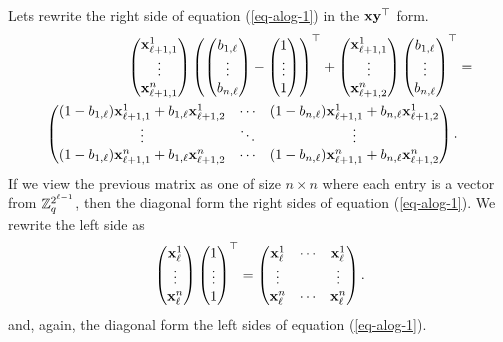 Lets rewrite the right side of equation (\ref{eq-alog-1}) in the $\mathbf{x}\mathbf{y}^\top$ form.
\begin{align*}
\left(\begin{matrix}\mathbf{x}^1_{\ell+1,1}\\\vdots\\\mathbf{x}^n_{\ell+1,1}\end{matrix}\right)\left(\left(\begin{matrix}b_{1,\ell}\\\vdots\\b_{n,\ell}\end{matrix}\right)-\left(\begin{matrix}1\\\vdots\\1\end{matrix}\right)\right)^\top+
\left(\begin{matrix}\mathbf{x}^1_{\ell+1,1}\\\vdots\\\mathbf{x}^n_{\ell+1,2}\end{matrix}\right)\left(\begin{matrix}b_{1,\ell}\\\vdots\\b_{n,\ell}\end{matrix}\right)^\top
&=\\
\begin{pmatrix}
(1-b_{1,\ell})\mathbf{x}^1_{\ell+1,1}+b_{1,\ell}\mathbf{x}^1_{\ell+1,2} & \cdots & (1-b_{n,\ell})\mathbf{x}^1_{\ell+1,1}+b_{n,\ell}\mathbf{x}^1_{\ell+1,2}\\
\vdots & \ddots  & \vdots\\ 
(1-b_{1,\ell})\mathbf{x}^n_{\ell+1,1}+b_{1,\ell}\mathbf{x}^n_{\ell+1,2} & \cdots & (1-b_{n,\ell})\mathbf{x}^n_{\ell+1,1}+b_{n,\ell}\mathbf{x}^n_{\ell+1,2}
\end{pmatrix}.&
\end{align*}
If we view the previous matrix as one of size $n\times n$ where each entry is a vector from $\mathbb{Z}_q^{2^{\ell-1}}$, then the diagonal form the right sides of equation (\ref{eq-alog-1}). We rewrite the left side as
\begin{align*}
\left(\begin{matrix}\mathbf{x}^1_\ell\\\vdots\\\mathbf{x}^n_\ell\end{matrix}\right)\left(\begin{matrix}1\\\vdots\\1\end{matrix}\right)^\top
=
\begin{pmatrix}
\mathbf{x}^1_\ell & \cdots & \mathbf{x}^1_\ell\\
\vdots          &        & \vdots         \\
\mathbf{x}^n_\ell & \cdots & \mathbf{x}^n_\ell
\end{pmatrix}.
\end{align*}
and, again, the diagonal form the left sides of equation (\ref{eq-alog-1}). 

